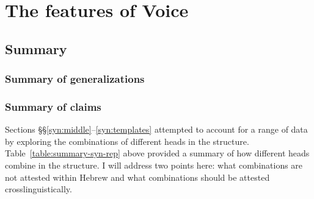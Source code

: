 \chapter{The features of Voice}
\label{chap:i}

\section{Summary} \label{i:sum}

	\subsection{Summary of generalizations}
		
	\subsection{Summary of claims}


Sections \S\S\ref{syn:middle}--\ref{syn:templates} attempted to account for a range of data by exploring the combinations of different heads in the structure. Table~\ref{table:summary-syn-rep} above provided a summary of how different heads combine in the structure. I will address two points here: what combinations are not attested within Hebrew and what combinations should be attested crosslinguistically.

